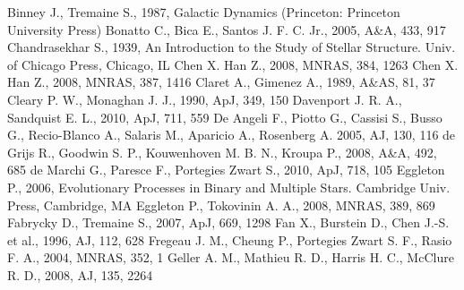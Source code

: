 \begin{thebibliography}{99}

 Binney
  J., Tremaine S., 1987, Galactic Dynamics (Princeton: Princeton
  University Press)
  Bonatto C., Bica E., Santos J. F. C. Jr., 2005, A\&A, 433, 917
  Chandrasekhar S., 1939, An Introduction to the Study of Stellar
  Structure. Univ. of Chicago Press, Chicago, IL 
 Chen
  X. Han Z., 2008, MNRAS, 384, 1263
 Chen
  X. Han Z., 2008, MNRAS, 387, 1416
  Claret A., Gimenez A., 1989, A\&AS, 81, 37
  Cleary P. W., Monaghan J. J., 1990, ApJ, 349, 150
  Davenport J. R. A., Sandquist
  E. L., 2010, ApJ, 711, 559
  De Angeli F., Piotto G., Cassisi S., Busso G., Recio-Blanco A.,
  Salaris M., Aparicio A., Rosenberg A. 2005, AJ, 130, 116
 de
  Grijs R., Goodwin S. P., Kouwenhoven M. B. N., Kroupa
  P., 2008, A\&A, 492, 685
 de Marchi G., Paresce F., Portegies
  Zwart S., 2010, ApJ, 718, 105
  Eggleton P., 2006, Evolutionary Processes in Binary and Multiple
  Stars. Cambridge Univ. Press, Cambridge, MA
  Eggleton P., Tokovinin A. A., 2008, MNRAS, 389, 869
 Fabrycky D., Tremaine S., 2007, ApJ,
  669, 1298
 Fan X.,
  Burstein D., Chen J.-S. et al., 1996, AJ, 112, 628
  Fregeau J. M., Cheung P., Portegies Zwart S. F., Rasio F. A., 2004,
  MNRAS, 352, 1  
  Geller A. M., Mathieu R. D., Harris H. C., McClure R. D., 2008,
  AJ, 135, 2264 

\end{thebibliography}
